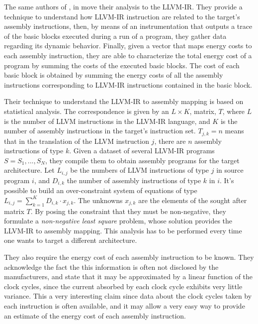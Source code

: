 The same authors of \cite{brando2008}, in \cite{brando2011} move their analysis to the LLVM-IR. They provide a technique to understand how LLVM-IR instruction are related to the target's assembly instructions, then, by means of an instrumentation that outputs a trace of the basic blocks executed during a run of a program, they gather data regarding its dynamic behavior. Finally, given a vector that maps energy costs to each assembly instruction, they are able to characterize the total energy cost of a program by summing the costs of the executed basic blocks. The cost of each basic block is obtained by summing the energy costs of all the assembly instructions corresponding to LLVM-IR instructions contained in the basic block. \par 
Their technique to understand the LLVM-IR to assembly mapping is based on statistical analysis. The correspondence is given by an $L \times K$, matrix, $T$, where $L$ is the number of LLVM instructions in the LLVM-IR language, and $K$ is the number of assembly instructions in the target's instruction set. $T_{j,k} = n$ means that in the translation of the LLVM instruction $j$, there are $n$ assembly instructions of type $k$. \newline Given a dataset of several LLVM-IR programs $S = {S_{1},...,S_{N}}$, they compile them to obtain assembly programs for the target architecture. Let $L_{i,j}$ be the numbers of LLVM instructions of type $j$ in source program $i$, and $D_{i,k}$ the number of assembly instructions of type $k$ in $i$. It's possible to build an over-constraint system of equations of type $L_{i,j} = \sum_{k=1}^{K} D_{i,k} \cdot x_{j,k}$. The unknowns $x_{j,k}$ are the elements of the sought after matrix $T$. By posing the constraint that they must be non-negative, they formulate a \emph{non-negative least square} problem, whose solution provides the LLVM-IR to assembly mapping. This analysis has to be performed every time one wants to target a different architecture. \par 
They also require the energy cost of each assembly instruction to be known. They acknowledge the fact the this information is often not disclosed by the manufacturers, and state that it may be approximated by a linear function of the clock cycles, since the  current absorbed by each clock cycle exhibits very little variance. This a very interesting claim since data about the clock cycles taken by each instruction is often available, and it may allow a very easy way to provide an estimate of the energy cost of each assembly instruction. \\[1in]


